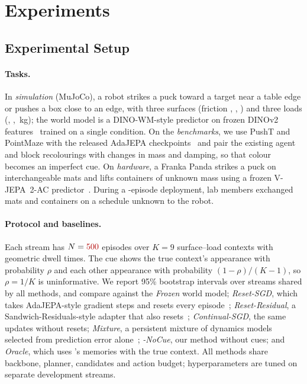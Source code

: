 \section{Experiments}\label{sec:experiments}

\subsection{Experimental Setup}

\paragraph{Tasks.}
In \emph{simulation} (MuJoCo), a robot strikes a puck toward a target near a table edge or pushes a box close to an edge, with three surfaces (friction , , ) and three loads (, , \,kg); the world model is a DINO-WM-style predictor on frozen DINOv2 features~\citep{zhou2025dinowm} trained on a single condition. On the \emph{benchmarks}, we use PushT and PointMaze with the released AdaJEPA checkpoints~\citep{wang2026adajepa} and pair the existing agent and block recolourings with changes in mass and damping, so that colour becomes an imperfect cue. On \emph{hardware}, a Franka Panda strikes a puck on interchangeable mats and lifts containers of unknown mass using a frozen V-JEPA~2-AC predictor~\citep{assran2025vjepa2}. During a -episode deployment, lab members exchanged mats and containers on a schedule unknown to the robot.

\paragraph{Protocol and baselines.}
Each stream has $N=\ph{500}$ episodes over $K=9$ surface--load contexts with geometric dwell times. The cue shows the true context's appearance with probability $\rho$ and each other appearance with probability $(1-\rho)/(K-1)$, so $\rho=1/K$ is uninformative. We report 95\% bootstrap intervals over  streams shared by all methods, and compare against the \emph{Frozen} world model; \emph{Reset-SGD}, which takes AdaJEPA-style gradient steps and resets every episode~\citep{wang2026adajepa}; \emph{Reset-Residual}, a Sandwich-Residuals-style adapter that also resets~\citep{soni2026sandwich}; \emph{Continual-SGD}, the same updates without resets; \emph{Mixture}, a persistent mixture of dynamics models selected from prediction error alone~\citep{nagabandi2019mole}; \emph{\method-NoCue}, our method without cues; and \emph{Oracle}, which uses \method's memories with the true context. All methods share backbone, planner, candidates and action budget; hyperparameters are tuned on separate development streams.

